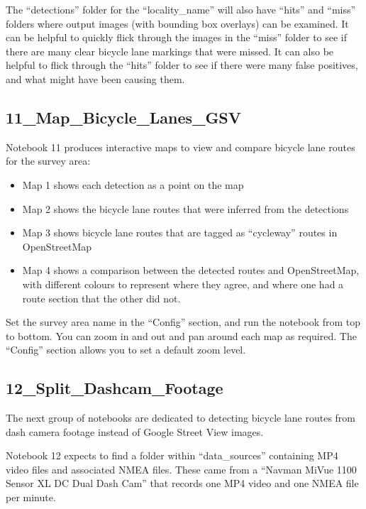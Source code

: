 \documentclass[11pt,twoside]{report}
\begin{document}
The ``detections'' folder for the ``locality\_name'' will also have ``hits'' and ``miss'' folders where output images (with bounding box overlays) can be examined.  It can be helpful to quickly flick through the images in the ``miss'' folder to see if there are many clear bicycle lane markings that were missed.  It can also be helpful to flick through the ``hits'' folder to see if there were many false positives, and what might have been causing them.


\subsection{11\_Map\_Bicycle\_Lanes\_GSV}
\label{a11}

Notebook 11 produces interactive maps to view and compare bicycle lane routes for the survey area:

\begin{itemize}
\item{Map 1 shows each detection as a point on the map}
\item{Map 2 shows the bicycle lane routes that were inferred from the detections}
\item{Map 3 shows bicycle lane routes that are tagged as ``cycleway'' routes in OpenStreetMap}
\item{Map 4 shows a comparison between the detected routes and OpenStreetMap, with different colours to represent where they agree, and where one had a route section that the other did not.}	
\end{itemize}

Set the survey area name in the ``Config'' section, and run the notebook from top to bottom.  You can zoom in and out and pan around each map as required.  The ``Config'' section allows you to set a default zoom level.


\subsection{12\_Split\_Dashcam\_Footage}
\label{a12}

The next group of notebooks are dedicated to detecting bicycle lane routes from dash camera footage instead of Google Street View images.

Notebook 12 expects to find a folder within ``data\_sources'' containing MP4 video files and associated NMEA files.  These came from a ``Navman MiVue 1100 Sensor XL DC Dual Dash Cam'' that records one MP4 video and one NMEA file per minute.
\end{document}
